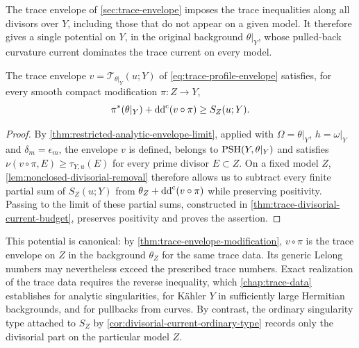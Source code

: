 The trace envelope of \cref{sec:trace-envelope} imposes the trace inequalities along all divisors over $Y$, including those that do not appear on a given model. It therefore gives a single potential on $Y$, in the original background $\theta|_Y$, whose pulled-back curvature current dominates the trace current on every model.

\begin{proposition}\label{prop:original-background-trace-majorant}
The trace envelope $v=\mathcal T_{\theta|_Y}(u;Y)$ of \eqref{eq:trace-profile-envelope} satisfies, for every smooth compact modification $\pi\colon Z\to Y$,
\[
 \pi^*(\theta|_Y)+\mathrm{dd}^{\mathrm{c}}(v\circ\pi)\geq S_Z(u;Y).
\]
\end{proposition}
\begin{proof}
By \cref{thm:restricted-analytic-envelope-limit}, applied with $\Omega=\theta|_Y$, $h=\omega|_Y$ and $\delta_m=\epsilon_m$, the envelope $v$ is defined, belongs to $\mathrm{PSH}(Y,\theta|_Y)$ and satisfies $\nu(v\circ\pi,E)\geq\tau_{Y,u}(E)$ for every prime divisor $E\subset Z$. On a fixed model $Z$, \cref{lem:nonclosed-divisorial-removal} therefore allows us to subtract every finite partial sum of $S_Z(u;Y)$ from $\theta_Z+\mathrm{dd}^{\mathrm{c}}(v\circ\pi)$ while preserving positivity. Passing to the limit of these partial sums, constructed in \cref{thm:trace-divisorial-current-budget}, preserves positivity and proves the assertion.
\end{proof}

This potential is canonical: by \cref{thm:trace-envelope-modification}, $v\circ\pi$ is the trace envelope on $Z$ in the background $\theta_Z$ for the same trace data. Its generic Lelong numbers may nevertheless exceed the prescribed trace numbers. Exact realization of the trace data requires the reverse inequality, which \cref{chap:trace-data} establishes for analytic singularities, for K\"ahler $Y$ in sufficiently large Hermitian backgrounds, and for pullbacks from curves. By contrast, the ordinary singularity type attached to $S_Z$ by \cref{cor:divisorial-current-ordinary-type} records only the divisorial part on the particular model $Z$.






